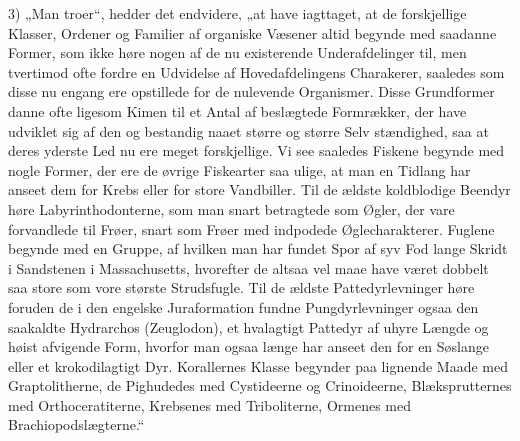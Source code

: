 \documentclass[12pt,a4paper]{book}
\renewcommand{\thefootnote}{*)}
\begin{document}
\renewcommand{\thefootnote}{*)}
{} 3) „Man troer“, hedder det endvidere, „at have iagttaget, at de
forskjellige Klasser, Ordener og Familier af organiske Væsener altid begynde
med saadanne Former, som ikke høre nogen af de nu existerende Underafdelinger
til, men tvertimod ofte fordre en Udvidelse af Hovedafdelingens
Charakerer, saaledes som disse nu engang ere opstillede for de nulevende
Organismer. Disse Grundformer danne ofte ligesom Kimen til et Antal af
beslægtede Formrækker, der have udviklet sig af den og bestandig naaet større
og større Selv\-%
stændighed, saa at deres yderste Led nu ere meget forskjellige. Vi see
saaledes Fiskene begynde med nogle Former, der ere de øvrige Fiskearter saa
ulige, at man en Tidlang har anseet dem for Krebs eller for store Vandbiller.
Til de ældste koldblodige Beendyr høre Labyrinthodonterne, som man snart
betragtede som Øgler, der vare forvandlede til Frøer, snart som Frøer med
indpodede Øglecharakterer. Fuglene begynde med en Gruppe, af hvilken man har
fundet Spor af syv Fod lange Skridt i Sandstenen i Massachusetts, hvorefter de
altsaa vel maae have været dobbelt saa store som vore største Strudsfugle. Til
de ældste Pattedyrlevninger høre foruden de i den engelske Juraformation
fundne Pungdyrlevninger ogsaa den saakaldte Hydrarchos (Zeuglodon), et
hvalagtigt Pattedyr af uhyre Længde og høist afvigende Form, hvorfor man ogsaa
længe har anseet den for en Søslange eller et krokodilagtigt Dyr. Korallernes
Klasse begynder paa lignende Maade med Graptolitherne, de Pighudedes med
Cystideerne og Crinoideerne, Blæksprutternes med Orthoceratiterne, Krebsenes
med Triboliterne, Ormenes med Brachiopodslægterne.“
\end{document}
